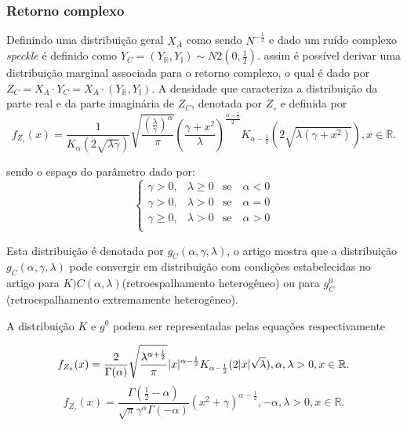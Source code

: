 \subsubsection{Retorno complexo}

Definindo uma distribuição geral $X_{A}$ como sendo $N^{-\frac{1}{2}}$ e dado um ruído complexo {\it speckle} é definido como $Y_{C}=(Y_{\mathbb{R}},Y_{\mathbb{I}})\sim N2(0,\frac{1}{2})$. assim é possível derivar uma distribuição marginal associada para o retorno complexo, o qual é dado por $Z_{C}=X_{A}\cdot Y_{C}=X_{
A}\cdot(Y_{\mathbb{R}},Y_{\mathbb{I}})$. A densidade que caracteriza a distribuição da parte real e da parte imaginária de $Z_{C}$, denotada por $Z_{\circ}$ e definida por
\begin{equation}\label{eqn107}
	f_{Z_{\circ}}(x)=\frac{1}{K_{\alpha}(2\sqrt{\lambda\gamma})}\sqrt{\frac{\left(\frac{\lambda}{\gamma} \right)^{\alpha}}{\pi}}\left(\frac{\gamma+x^2}{\lambda} \right)^{\frac{\alpha-\frac{1}{2}}{2}}K_{\alpha-\frac{1}{2}}\left(2\sqrt{\lambda(\gamma+x^2)}\right), x\in\mathbb{R}. 
\end{equation}

sendo o espaço do parâmetro dado por:
\begin{equation}\label{eqn108}
	\left\{
\begin{array}{ccr}
	\gamma>0,&\lambda\geq 0&\mbox{se}\quad\alpha<0 \\
	\gamma>0,&\lambda > 0&\mbox{se}\quad\alpha=0 \\
	\gamma\geq0,&\lambda> 0&\mbox{se}\quad\alpha>0 \\
\end{array}
\right.
\end{equation}

Esta distribuição é denotada por $g_{C}(\alpha,\gamma,\lambda)$, o artigo mostra que a distribuição $g_{C}(\alpha,\gamma,\lambda)$ pode convergir em distribuição com condições estabelecidas no artigo para $K){C}(\alpha,\lambda)$(retroespalhamento heterogêneo) ou para $g_{C}^{0}$ (retroespalhamento extremamente heterogêneo).

A distribuição $K$ e $g^0$ podem ser representadas pelas equações respectivamente

\begin{equation}\label{eqn109}
	f_{Z_{\circ}}(x)=\frac{2}{\Gamma(\alpha)}\sqrt{\frac{\lambda^{\alpha+\frac{1}{2}}}{\pi}} |x|^{\alpha-\frac{1}{2}}K_{\alpha-\frac{1}{2}}(2|x|\sqrt{\lambda}), \alpha,\lambda>0, x\in\mathbb{R}. \\
\end{equation}
\begin{equation}\label{eqn110}
	f_{Z_{\circ}}(x)=\frac{\Gamma(\frac{1}{2}-\alpha)}{\sqrt{\pi}\gamma^{\alpha}\Gamma(-\alpha)}\left(x^2+\gamma\right)^{\alpha-\frac{1}{2}}, -\alpha,\lambda>0, x\in\mathbb{R}. 
\end{equation}

